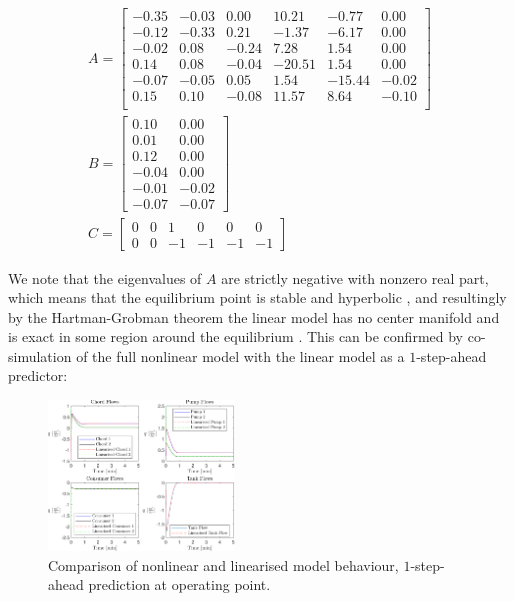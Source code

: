 \begin{equation}\label{eq:LinearisedModelWithTank}
\begin{gathered}
	A = \begin{bmatrix}
		-0.35 & -0.03 & 0.00 & 10.21 & -0.77 & 0.00\\
		-0.12 & -0.33 & 0.21 & -1.37 & -6.17  & 0.00\\
		-0.02 & 0.08 & -0.24 & 7.28 & 1.54 & 0.00\\
		0.14 & 0.08 & -0.04 & -20.51 & 1.54 & 0.00\\
		-0.07 & -0.05 & 0.05 & 1.54 & -15.44 &   -0.02\\
		0.15 & 0.10 & -0.08 & 11.57 & 8.64 & -0.10\\
	\end{bmatrix} \\
	B = \begin{bmatrix}
		0.10 & 0.00\\
		0.01 & 0.00 \\
		0.12 & 0.00 \\
		-0.04 & 0.00 \\
		-0.01 & -0.02\\
		-0.07 & -0.07
	\end{bmatrix}
\\
		C = \begin{bmatrix} 
			0 & 0 & 1 & 0 & 0 & 0	\\		
			0 & 0 & -1 & -1 & -1 & -1
		\end{bmatrix}
\end{gathered}
\end{equation}

We note that the eigenvalues of $A$ are strictly negative with nonzero real part, which means that the equilibrium point is stable and hyperbolic \cite{Khalil}, and resultingly by the Hartman-Grobman theorem the linear model has no center manifold and is exact in some region around the equilibrium \cite{Perko2001}. This can be confirmed by co-simulation of the full nonlinear model with the linear model as a $1$-step-ahead predictor:


\begin{figure}[h]
	\centering
	\includegraphics[height = 4cm,width=\linewidth]{Graphics/NominalFlows.pdf}
	\caption{Comparison of nonlinear and linearised model behaviour, $1$-step-ahead prediction at operating point.}
	\label{fig:CompNonLinEQ}
\end{figure}

